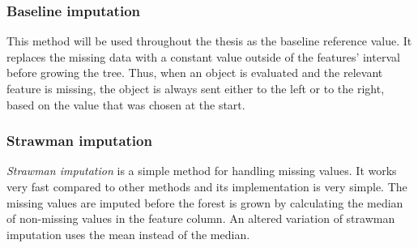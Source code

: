 \documentclass[11pt]{article}
\begin{document}
      \subsubsection{Baseline imputation}
        \label{sec:baseline}
        This method will be used throughout the thesis as the baseline reference value. It replaces the missing data with a constant value outside of the features' interval before growing the tree. Thus, when an object is evaluated and the relevant feature is missing, the object is always sent either to the left or to the right, based on the value that was chosen at the start.
      \subsubsection{Strawman imputation}
        \label{sec:strawman}
        {\it Strawman imputation} \cite{otfi} is a simple method for handling missing values. It works very fast compared to other methods and its implementation is very simple. The missing values are imputed before the forest is grown by calculating the median of non-missing values in the feature column. An altered variation of strawman imputation uses the mean instead of the median.
\end{document}
